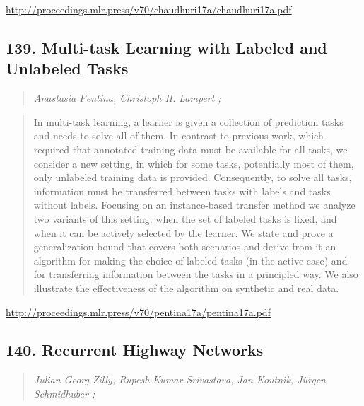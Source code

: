 \documentclass{article}
\begin{document}
\href{http://proceedings.mlr.press/v70/chaudhuri17a/chaudhuri17a.pdf}{http://proceedings.mlr.press/v70/chaudhuri17a/chaudhuri17a.pdf}

\subsection{139. Multi-task Learning with Labeled and Unlabeled Tasks}

\begin{quote}
\footnotesize{\textit{Anastasia Pentina, Christoph H. Lampert ;}}

\end{quote}

\begin{quote}
    In multi-task learning, a learner is given a collection of prediction tasks and needs to solve all of them. In contrast to previous work, which required that annotated training data must be available for all tasks, we consider a new setting, in which for some tasks, potentially most of them, only unlabeled training data is provided. Consequently, to solve all tasks, information must be transferred between tasks with labels and tasks without labels. Focusing on an instance-based transfer method we analyze two variants of this setting: when the set of labeled tasks is fixed, and when it can be actively selected by the learner. We state and prove a generalization bound that covers both scenarios and derive from it an algorithm for making the choice of labeled tasks (in the active case) and for transferring information between the tasks in a principled way. We also illustrate the effectiveness of the algorithm on synthetic and real data.  
\end{quote}

\href{http://proceedings.mlr.press/v70/pentina17a/pentina17a.pdf}{http://proceedings.mlr.press/v70/pentina17a/pentina17a.pdf}

\subsection{140. Recurrent Highway Networks}

\begin{quote}
\footnotesize{\textit{Julian Georg Zilly, Rupesh Kumar Srivastava, Jan Koutnı́k, Jürgen Schmidhuber ;}}

\end{quote}
\end{document}
